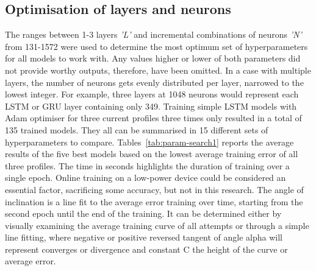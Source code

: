 %
%

\subsection{Optimisation of layers and neurons}
%
The ranges between 1-3 layers \textit{'L'} and incremental combinations of neurons \textit{'N'} from 131-1572 were used to determine the most optimum set of hyperparameters for all models to work with.
Any values higher or lower of both parameters did not provide worthy outputs, therefore, have been omitted.
In a case with multiple layers, the number of neurons gets evenly distributed per layer, narrowed to the lowest integer.
For example, three layers at 1048 neurons would represent each LSTM or GRU layer containing only 349.
Training simple LSTM models with Adam optimiser for three current profiles three times only resulted in a total of 135 trained models.
They all can be summarised in 15 different sets of hyperparameters to compare.
\mbox{Tables~\ref{tab:param-search1}} reports the average results of the five best models based on the lowest average training error of all three profiles.
The time in seconds highlights the duration of training over a single epoch.
Online training on a low-power device could be considered an essential factor, sacrificing some accuracy, but not in this research.
The angle of inclination is a line fit to the average error training over time, starting from the second epoch until the end of the training.
It can be determined either by visually examining the average training curve of all attempts or through a simple line fitting, where negative or positive reversed tangent of angle alpha will represent converges or divergence and constant C the height of the curve or average error.
